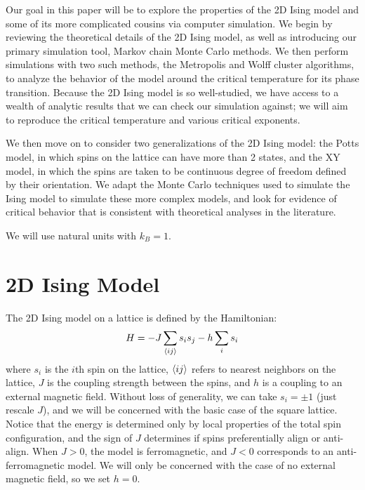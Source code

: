 \documentclass[twocolumn,aps,prl]{revtex4-1} %
\begin{document}
Our goal in this paper will be to explore the properties of the 2D Ising model and some of its more complicated cousins via computer simulation. We begin by reviewing the theoretical details of the 2D Ising model, as well as introducing our primary simulation tool, Markov chain Monte Carlo methods. We then perform simulations with two such methods, the Metropolis and Wolff cluster algorithms, to analyze the behavior of the model around the critical temperature for its phase transition. Because the 2D Ising model is so well-studied, we have access to a wealth of analytic results that we can check our simulation against; we will aim to reproduce the critical temperature and various critical exponents.

We then move on to consider two generalizations of the 2D Ising model: the Potts model, in which spins on the lattice can have more than 2 states, and the XY model, in which the spins are taken to be continuous degree of freedom defined by their orientation. We adapt the Monte Carlo techniques used to simulate the Ising model to simulate these more complex models, and look for evidence of critical behavior that is consistent with theoretical analyses in the literature.

We will use natural units with $k_B = 1$. 


\section{2D Ising Model}
The 2D Ising model on a lattice is defined by the Hamiltonian:
\begin{equation}
H = -J\sum_{\braket{ij}}s_is_j - h\sum_i s_i
\end{equation}
where $s_i$ is the $i$th spin on the lattice, $\braket{ij}$ refers to nearest neighbors on the lattice, $J$ is the coupling strength between the spins, and $h$ is a coupling to an external magnetic field. Without loss of generality, we can take $s_i = \pm 1$ (just rescale $J$), and we will be concerned with the basic case of the square lattice. Notice that the energy is determined only by local properties of the total spin configuration, and the sign of $J$ determines if spins preferentially align or anti-align. When $J > 0$, the model is ferromagnetic, and $J < 0$ corresponds to an anti-ferromagnetic model. We will only be concerned with the case of no external magnetic field, so we set $h = 0$. 
\end{document}
